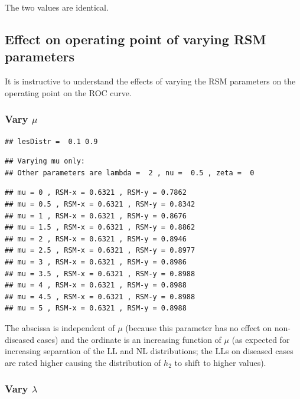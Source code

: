 \documentclass[
]{book}
\begin{document}
The two values are identical.

\hypertarget{effect-on-operating-point-of-varying-rsm-parameters}{%
\subsection{Effect on operating point of varying RSM parameters}\label{effect-on-operating-point-of-varying-rsm-parameters}}

It is instructive to understand the effects of varying the RSM parameters on the operating point on the ROC curve.

\hypertarget{vary-mu}{%
\subsubsection{\texorpdfstring{Vary \(\mu\)}{Vary \textbackslash mu}}\label{vary-mu}}

\begin{verbatim}
## lesDistr =  0.1 0.9
\end{verbatim}

\begin{verbatim}
## Varying mu only: 
## Other parameters are lambda =  2 , nu =  0.5 , zeta =  0
\end{verbatim}

\begin{verbatim}
## mu = 0 , RSM-x = 0.6321 , RSM-y = 0.7862 
## mu = 0.5 , RSM-x = 0.6321 , RSM-y = 0.8342 
## mu = 1 , RSM-x = 0.6321 , RSM-y = 0.8676 
## mu = 1.5 , RSM-x = 0.6321 , RSM-y = 0.8862 
## mu = 2 , RSM-x = 0.6321 , RSM-y = 0.8946 
## mu = 2.5 , RSM-x = 0.6321 , RSM-y = 0.8977 
## mu = 3 , RSM-x = 0.6321 , RSM-y = 0.8986 
## mu = 3.5 , RSM-x = 0.6321 , RSM-y = 0.8988 
## mu = 4 , RSM-x = 0.6321 , RSM-y = 0.8988 
## mu = 4.5 , RSM-x = 0.6321 , RSM-y = 0.8988 
## mu = 5 , RSM-x = 0.6321 , RSM-y = 0.8988
\end{verbatim}

The abscissa is independent of \(\mu\) (because this parameter has no effect on non-diseased cases) and the ordinate is an increasing function of \(\mu\) (as expected for increasing separation of the LL and NL distributions; the LLs on diseased cases are rated higher causing the distribution of \(h_2\) to shift to higher values).

\hypertarget{vary-lambda}{%
\subsubsection{\texorpdfstring{Vary \(\lambda\)}{Vary \textbackslash lambda}}\label{vary-lambda}}
\end{document}
